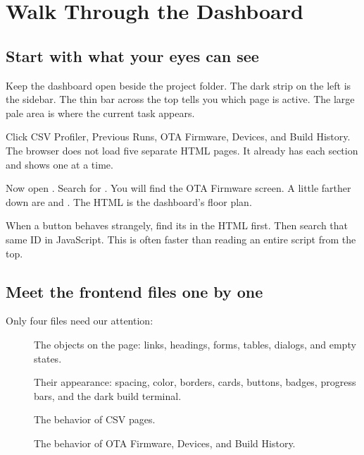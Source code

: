 \chapter{Walk Through the Dashboard}

\section{Start with what your eyes can see}

Keep the dashboard open beside the project folder. The dark strip on the left is the sidebar. The thin bar across the top tells you which page is active. The large pale area is where the current task appears.

Click CSV Profiler, Previous Runs, OTA Firmware, Devices, and Build History. The browser does not load five separate HTML pages. It already has each section and shows one at a time.

Now open . Search for . You will find the OTA Firmware screen. A little farther down are  and . The HTML is the dashboard's floor plan.

\begin{mentorbox}
When a button behaves strangely, find its  in the HTML first. Then search that same ID in JavaScript. This is often faster than reading an entire script from the top.
\end{mentorbox}

\section{Meet the frontend files one by one}

Only four files need our attention:

\begin{description}
  \item[] The objects on the page: links, headings, forms, tables, dialogs, and empty states.
  \item[] Their appearance: spacing, color, borders, cards, buttons, badges, progress bars, and the dark build terminal.
  \item[] The behavior of CSV pages.
  \item[] The behavior of OTA Firmware, Devices, and Build History.
\end{description}

